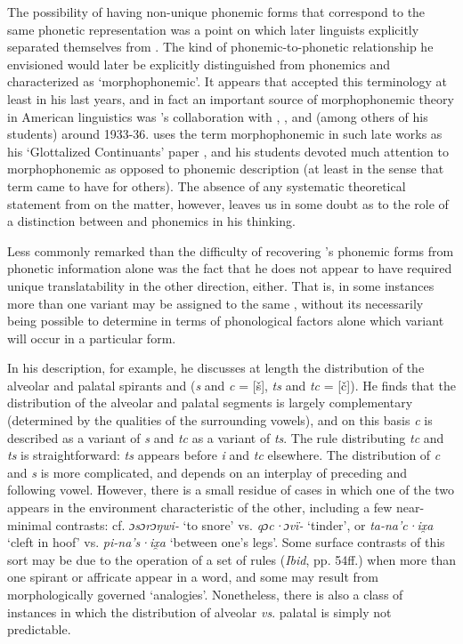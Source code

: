 The possibility of having non-unique phonemic forms that correspond to
the same phonetic representation was a point on which later linguists
explicitly separated themselves from {\Sapir}. The kind of
phonemic-to-phonetic relationship he envisioned would later be
explicitly distinguished from phonemics and characterized as
`morphophonemic'. It appears that {\Sapir} accepted this terminology at
least in his last years, and in fact an important source of
morphophonemic theory in American linguistics was {\Sapir}'s
collaboration with {\Swadesh}, {\Newman}, and {\Voegelin} (among others of his
students) around 1933-36. {\Sapir} uses the term morphophonemic in such
late works as his `Glottalized Continuants' paper
\citep{sapir38:glottalized.continuants}, and his students devoted much
attention to morphophonemic as opposed to phonemic description (at
least in the sense that term came to have for others). The absence of
any systematic theoretical statement from {\Sapir} on the matter,
however, leaves us in some doubt as to the role of a distinction
between  and phonemics in his thinking.

Less commonly remarked than the difficulty of recovering {\Sapir}'s
phonemic forms from phonetic information alone was the fact that he
does not appear to have required unique translatability in the other
direction, either. That is, in some instances more than one variant
may be assigned to the same , without its necessarily being
possible to determine in terms of phonological factors alone which
variant will occur in a particular form.

In his  description, for example, he discusses at
length \citep[47f.]{sapir30:s.paiute} the distribution of the alveolar
and palatal spirants and  (\emph{s} and \emph{c} = [š],
\emph{ts} and \emph{tc} = [č]). He finds that the distribution of the
alveolar and palatal segments is largely complementary (determined by
the qualities of the surrounding vowels), and on this basis \emph{c}
is described as a variant of \emph{s} and \emph{tc} as a variant of
\emph{ts}. The rule distributing \emph{tc} and \emph{ts} is
straightforward: \emph{ts} appears before \emph{i} and \emph{tc}
elsewhere. The distribution of \emph{c} and \emph{s} is more
complicated, and depends on an interplay of preceding and following
vowel. However, there is a small residue of cases in which one of the
two appears in the environment characteristic of the other, including
a few near-minimal contrasts: cf. \emph{ɔsɔrɔŋwi-} `to snore'
vs. \emph{qɔc·ɔvï-} `tinder', or \emph{ ta-na'c·ix̯a} `cleft in hoof'
vs. \emph{pi-na's·ix̯a} `between one's legs'. Some surface contrasts of
this sort may be due to the operation of a set of  rules
(\emph{Ibid}, pp. 54ff.) when more than one spirant or affricate appear in a
word, and some may result from morphologically governed
`analogies'. Nonetheless, there is also a class of instances in which
the distribution of alveolar \emph{vs}. palatal  is simply not
predictable.

